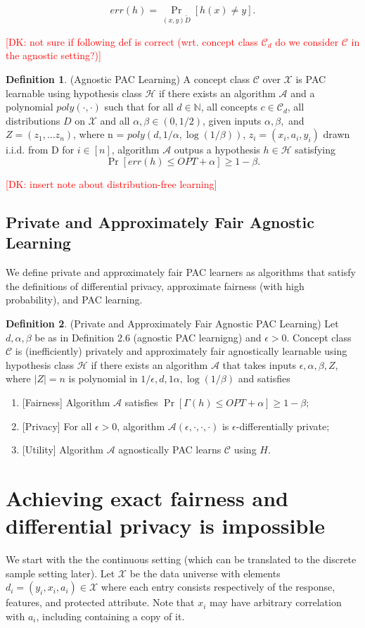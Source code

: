 \documentclass[format = sigconf]{acmart}
\newcommand{\dk}[1]{\textcolor{red}{[DK: #1]}}
\newcommand{\A}{\mathcal{A}}
\renewcommand{\H}{\mathcal{H}}
\newcommand{\C}{\mathcal{C}}
\newcommand{\X}{\mathcal{X}}
\newcommand{\1}{\mathbbm{1}}
\newcommand{\eps}{\epsilon}
\theoremstyle{definition}
\newtheorem{defn}{Definition}[section]
\begin{document}
$$err(h) = \Pr_{(x,y) \tilde D}[h(x) \neq y].$$

\dk {not sure if following def is correct (wrt. concept class $\C_d$ do we consider $\C$ in the agnostic setting?)}
\begin{defn}
	(Agnostic PAC Learning) A concept class $\C$ over $\X$ is PAC learnable using hypothesis class $\H$ if there exists an algorithm $\A$ and a polynomial $poly(\cdot,\cdot)$ such that for all $d \in \mathbb{N}$, all concepts $c \in \mathcal{C}_d$, all distributions $D$ on $\X$ and all $\alpha,\beta \in (0,1/2)$, given inputs $\alpha,\beta,$ and $Z = (z_1, ... z_n)$, where n = $poly(d, 1/\alpha, \log(1/\beta))$, $z_i = (x_i, a_i, y_i)$ drawn i.i.d. from D for $i \in [n]$, algorithm $\A$ outpus a hypothesis $h \in \H$ satisfying
	$$\Pr[err(h) \leq OPT + \alpha] \geq 1-\beta.$$

\end{defn}
\dk {insert note about distribution-free learning}
\subsection{Private and Approximately Fair Agnostic Learning}
We define private and approximately fair PAC learners as algorithms that satisfy the definitions of differential privacy, approximate fairness (with high probability), and PAC learning.
\begin{defn}
	(Private and Approximately Fair Agnostic PAC Learning)
	Let $d, \alpha, \beta$ be as in Definition 2.6 (agnostic PAC learnigng) and $\eps > 0$. Concept class $\C$ is (inefficiently) privately and approximately fair agnostically learnable using hypothesis class $\H$ if there exists an algorithm $\A$ that takes inputs $\eps, \alpha, \beta, Z$, where $|Z|=n$ is polynomial in $1/\eps, d, 1\alpha, \log(1/\beta)$ and satisfies 
	\begin{enumerate}
		\item {[}Fairness{]} Algorithm $\A$ satisfies $\Pr[\Gamma(h) \leq OPT + \alpha] \geq 1-\beta$;
		\item {[}Privacy{]} For all $\eps>0$, algorithm $\A(\eps, \cdot, \cdot, \cdot)$ is $\eps$-differentially private;
		\item {[}Utility{]} Algorithm $\A$ agnostically PAC learns $\C$ using $H$.
	\end{enumerate}
\end{defn}

\section{Achieving exact fairness and differential privacy is impossible}
We start with the the continuous setting (which can be translated to the discrete sample setting later). Let $\mathcal{X}$ be the data universe with elements $d_i = (y_i,x_i,a_i) \in \mathcal{X}$ where each entry consists respectively of the response, features, and protected attribute. Note that $x_i$ may have arbitrary correlation with $a_i$, including containing a copy of it.
\end{document}
